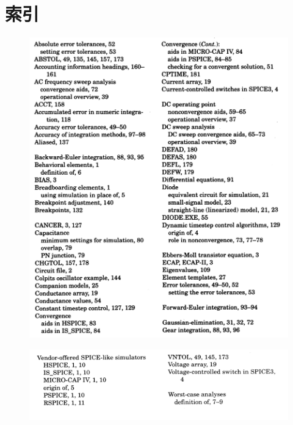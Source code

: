 \chapter*{索引}

\begin{figure}[htbp]
\small
    \centering
    \includegraphics[width=\textwidth]{figure/Index/第一个.png}
\end{figure}

\begin{figure}[htbp]
\small
    \centering
    \includegraphics[width=\textwidth]{figure/Index/第二个.png}
\end{figure}